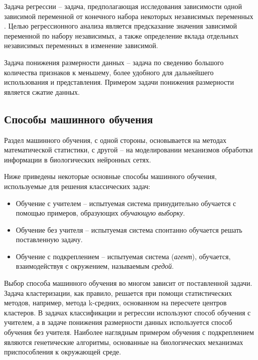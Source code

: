 Задача регрессии -- задача, предполагающая исследования зависимости одной зависимой переменной
от конечного набора некоторых независимых переменных \cite{foerster}. Целью регрессионного анализа является
предсказание значения зависимой переменной по набору независимых, а также определение
вклада отдельных независимых переменных в изменение зависимой.

Задача понижения размерности данных -- задача по сведению большого количества
признаков к меньшему, более удобного для дальнейшего использования и представления. 
Примером задачи понижения размерности является сжатие данных.

\subsection{Способы машинного обучения}

Раздел машинного обучения, с одной стороны, основывается на методах математической 
статистики, с другой -- на моделировании механизмов обработки информации 
в биологических нейронных сетях.

Ниже приведены некоторые основные способы машинного обучения, используемые для
решения классических задач:

\begin{itemize}
      \item Обучение с учителем -- испытуемая система принудительно обучается
      с помощью примеров, образующих \emph{обучающую выборку}.

      \item Обучение без учителя -- испытуемая система спонтанно обучается 
      решать поставленную задачу.

      \item Обучение с подкреплением -- испытуемая система (\emph{агент}), обучается,
      взаимодействуя с окружением, называемым \emph{средой}.
\end{itemize}

Выбор способа машинного обучения во многом зависит от поставленной задачи.
Задача кластеризации, как правило, решается при помощи статистических методов, 
например, метода k-средних, основанном на пересчете центров кластеров. 
В задачах классификации и регрессии используют способ обучения с учителем, 
а в задаче понижения размерности данных используется способ обучения без учителя. 
Наиболее наглядным примером обучения с подкреплением являются генетические алгоритмы, 
основанные на биологических механизмах приспособления к окружающей среде. 